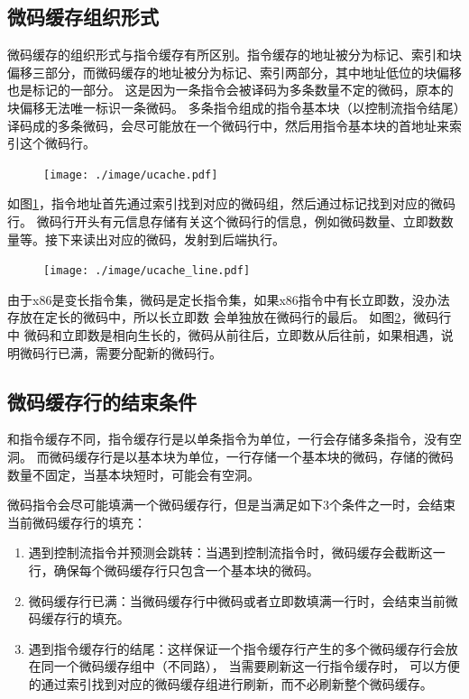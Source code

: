 \subsection{微码缓存组织形式}

微码缓存的组织形式与指令缓存有所区别。指令缓存的地址被分为标记、索引和块偏移三部分，而微码缓存的地址被分为标记、索引两部分，其中地址低位的块偏移也是标记的一部分。
这是因为一条指令会被译码为多条数量不定的微码，原本的块偏移无法唯一标识一条微码。
多条指令组成的指令基本块（以控制流指令结尾）译码成的多条微码，会尽可能放在一个微码行中，然后用指令基本块的首地址来索引这个微码行。

\begin{figure}[!htbp]
  \centering
  \texttt{[image: ./image/ucache.pdf]}
  \label{img:ucache}
\end{figure}

如图\ref{img:ucache}，指令地址首先通过索引找到对应的微码组，然后通过标记找到对应的微码行。
微码行开头有元信息存储有关这个微码行的信息，例如微码数量、立即数数量等。接下来读出对应的微码，发射到后端执行。

\begin{figure}[!htbp]
  \centering
  \texttt{[image: ./image/ucache\_line.pdf]}
  \label{img:ucache_line}
\end{figure}

由于x86是变长指令集，微码是定长指令集，如果x86指令中有长立即数，没办法存放在定长的微码中，所以长立即数
会单独放在微码行的最后。
如图\ref{img:ucache_line}，微码行中
微码和立即数是相向生长的，微码从前往后，立即数从后往前，如果相遇，说明微码行已满，需要分配新的微码行。


\subsection{微码缓存行的结束条件}\label{sec:ucache_end}

和指令缓存不同，指令缓存行是以单条指令为单位，一行会存储多条指令，没有空洞。
而微码缓存行是以基本块为单位，一行存储一个基本块的微码，存储的微码数量不固定，当基本块短时，可能会有空洞。

微码指令会尽可能填满一个微码缓存行，但是当满足如下3个条件之一时，会结束当前微码缓存行的填充\cite{solomonMicrooperationCachePower2001}：
\begin{enumerate}
  \item 遇到控制流指令并预测会跳转：当遇到控制流指令时，微码缓存会截断这一行，确保每个微码缓存行只包含一个基本块的微码。
  \item 微码缓存行已满：当微码缓存行中微码或者立即数填满一行时，会结束当前微码缓存行的填充。
  \item 遇到指令缓存行的结尾：这样保证一个指令缓存行产生的多个微码缓存行会放在同一个微码缓存组中（不同路），
  当需要刷新这一行指令缓存时， 可以方便的通过索引找到对应的微码缓存组进行刷新，而不必刷新整个微码缓存。
\end{enumerate}

